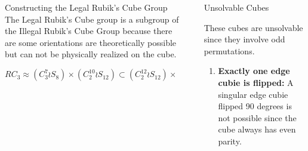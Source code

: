 \documentclass[final]{beamer}
\newlength{\sepwidth}
\newlength{\colwidth}
\newcommand{\separatorcolumn}{\begin{column}{\sepwidth}\end{column}}
\begin{document}
\begin{frame}[t]
\begin{columns}[t]
\begin{column}{\colwidth}
\begin{block}{Constructing the Legal Rubik's Cube Group}
    The Legal Rubik's Cube group is a subgroup of the Illegal Rubik's Cube Group because there are some orientations are theoretically possible but can not be physically realized on the cube.

$$RC_{3} \approx (C_{3}^{7} \wr S_{8}) \times (C_{2}^{10} \wr S_{12}) \subset  (C^{12}_2 \wr S_{12}) \times (C^8_3 \wr S_8) \approx RC^{*}_{3}$$


    




    




  \end{block}

\end{column}

\separatorcolumn

\begin{column}{\colwidth}

  \begin{block}{Unsolvable Cubes}

    These cubes are unsolvable since they involve odd permutations.

    \begin{enumerate}
      
      \item \textbf{Exactly one edge cubie is flipped:}
      A singular edge cubie flipped 90 degrees is not possible since the cube always has even parity.
      

\end{enumerate}
\end{block}
\end{column}
\end{columns}
\end{frame}
\end{document}
